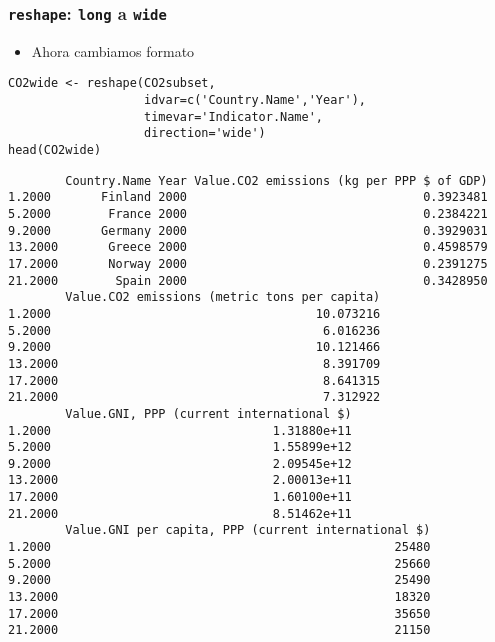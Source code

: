 \documentclass[xcolor={usenames,svgnames,dvipsnames}]{beamer}
\begin{document}
\begin{frame}[fragile]
\frametitle{\texttt{reshape}: \texttt{long} a \texttt{wide}}
\label{sec-4-6}

\begin{itemize}
\item Ahora cambiamos formato
\end{itemize}

\lstset{language=R}
\begin{lstlisting}
CO2wide <- reshape(CO2subset,
                   idvar=c('Country.Name','Year'),
                   timevar='Indicator.Name',
                   direction='wide')
head(CO2wide)
\end{lstlisting}


\begin{verbatim}
        Country.Name Year Value.CO2 emissions (kg per PPP $ of GDP)
1.2000       Finland 2000                                 0.3923481
5.2000        France 2000                                 0.2384221
9.2000       Germany 2000                                 0.3929031
13.2000       Greece 2000                                 0.4598579
17.2000       Norway 2000                                 0.2391275
21.2000        Spain 2000                                 0.3428950
        Value.CO2 emissions (metric tons per capita)
1.2000                                     10.073216
5.2000                                      6.016236
9.2000                                     10.121466
13.2000                                     8.391709
17.2000                                     8.641315
21.2000                                     7.312922
        Value.GNI, PPP (current international $)
1.2000                               1.31880e+11
5.2000                               1.55899e+12
9.2000                               2.09545e+12
13.2000                              2.00013e+11
17.2000                              1.60100e+11
21.2000                              8.51462e+11
        Value.GNI per capita, PPP (current international $)
1.2000                                                25480
5.2000                                                25660
9.2000                                                25490
13.2000                                               18320
17.2000                                               35650
21.2000                                               21150
\end{verbatim}
\end{frame}
\end{document}
